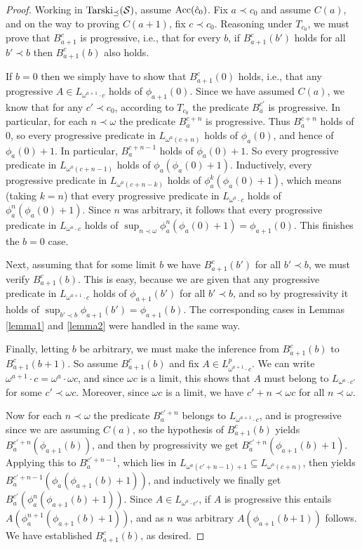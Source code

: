 \documentclass{amsart}
\begin{document}
\begin{proof}
Working in ${\rm Tarski}_{\preceq}(\mathcal{S})$, assume ${\rm Acc}(\hat{c}_0)$.
Fix $a \prec c_0$ and assume $C(a)$, and on the way to proving $C(a+1)$, fix $c \prec c_0$.
Reasoning under $T_{c_0}$, we must prove that $B_{a+1}^c$ is progressive, i.e., that for every
$b$, if $B_{a+1}^c(b')$ holds for all $b' \prec b$ then $B_{a+1}^c(b)$ also holds.

If $b = 0$ then we simply have to show that $B_{a+1}^c(0)$ holds, i.e., that any progressive
$A \in L_{\omega^{a+1}\cdot c}$ holds of $\phi_{a+1}(0)$. Since we have assumed $C(a)$, we
know that for any $c' \prec c_0$, according to $T_{c_0}$ the predicate $B_a^{c'}$ is progressive. In
particular, for each $n \prec \omega$ the predicate $B_a^{c + n}$ is progressive. Thus $B_a^{c+n}$
holds of $0$, so every progressive predicate in $L_{\omega^a(c + n)}$ holds of $\phi_a(0)$,
and hence of $\phi_a(0) + 1$. In particular, $B_a^{c + n - 1}$ holds of $\phi_a(0) + 1$.
So every progressive predicate in $L_{\omega^a(c+n-1)}$ holds of $\phi_a(\phi_a(0) + 1)$.
Inductively, every progressive predicate in $L_{\omega^a(c + n - k)}$ holds of
$\phi_a^k(\phi_a(0) + 1)$, which means (taking $k = n$) that every progressive
predicate in $L_{\omega^a\cdot c}$ holds of $\phi_a^n(\phi_a(0) + 1)$. Since $n$ was arbitrary, it
follows that every progressive predicate in $L_{\omega^a\cdot c}$ holds of $\sup_{n \prec \omega}
\phi_a^n(\phi_a(0) + 1) = \phi_{a+1}(0)$. This finishes the $b = 0$ case.

Next, assuming that for some limit $b$ we have $B_{a+1}^c(b')$
for all $b' \prec b$, we must verify $B_{a+1}^c(b)$. This is easy, because we are given that any
progressive predicate in $L_{\omega^{a+1}\cdot c}$ holds of $\phi_{a+1}(b')$ for all $b' \prec b$,
and so by progressivity it holds of $\sup_{b' \prec b}\phi_{a+1}(b') = \phi_{a+1}(b)$. The corresponding
cases in Lemmas \ref{lemma1} and \ref{lemma2} were handled in the same way.

Finally, letting $b$ be arbitrary, we must
make the inference from $B_{a+1}^c(b)$ to $B_{a+1}^c(b + 1)$. So assume $B_{a+1}^c(b)$ and fix
$A \in L^p_{\omega^{a+1}\cdot c}$. We can write $\omega^{a+1}\cdot c = \omega^a\cdot \omega c$,
and since $\omega c$ is a limit, this shows that $A$ must belong to $L_{\omega^a\cdot c'}$ for
some $c' \prec \omega c$. Moreover, since $\omega c$ is a limit, we have $c' + n \prec \omega c$
for all $n \prec \omega$.

Now for each $n \prec \omega$ the
predicate $B_a^{c' + n}$ belongs to $L_{\omega^{a+1}\cdot c}$, and is progressive since we are
assuming $C(a)$, so the hypothesis of $B_{a+1}^c(b)$ yields $B_a^{c' + n}(\phi_{a+1}(b))$,
and then by progressivity we get $B_a^{c' + n}(\phi_{a+1}(b) + 1)$. Applying this to
$B_a^{c' + n - 1}$, which lies in $L_{\omega^a(c' + n - 1) + 1} \subseteq L_{\omega^a(c + n)}$, then yields
$B_a^{c' + n - 1}(\phi_a(\phi_{a+1}(b) + 1))$,
and inductively we finally get $B_a^{c'}(\phi_a^n(\phi_{a+1}(b) + 1))$. Since
$A \in L_{\omega^a\cdot c'}$, if $A$ is progressive this entails
$A(\phi_a^{n+1}(\phi_{a+1}(b) + 1))$, and as $n$ was arbitrary
$A(\phi_{a+1}(b + 1))$ follows. We have established $B_{a+1}^c(b)$, as desired.
\end{proof}
\end{document}
